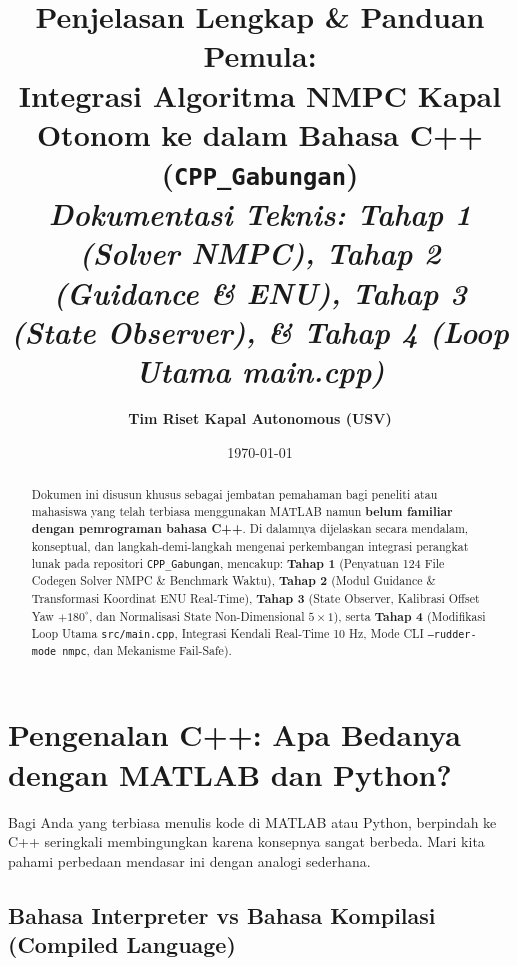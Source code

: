 \documentclass[11pt,a4paper]{article}
\title{
    \vspace{-1.0cm}
    \Huge \textbf{Penjelasan Lengkap \& Panduan Pemula:}\\[0.3cm]
    \LARGE Integrasi Algoritma NMPC Kapal Otonom ke dalam Bahasa C++ (\texttt{CPP\_Gabungan})\\[0.2cm]
    \large \textit{Dokumentasi Teknis: Tahap 1 (Solver NMPC), Tahap 2 (Guidance \& ENU), Tahap 3 (State Observer), \& Tahap 4 (Loop Utama main.cpp)}
}
\author{\textbf{Tim Riset Kapal Autonomous (USV)}}
\date{\today}
\begin{document}
\maketitle

\begin{abstract}
Dokumen ini disusun khusus sebagai jembatan pemahaman bagi peneliti atau mahasiswa yang telah terbiasa menggunakan MATLAB namun \textbf{belum familiar dengan pemrograman bahasa C++}. Di dalamnya dijelaskan secara mendalam, konseptual, dan langkah-demi-langkah mengenai perkembangan integrasi perangkat lunak pada repositori \texttt{CPP\_Gabungan}, mencakup: \textbf{Tahap 1} (Penyatuan 124 File Codegen Solver NMPC \& Benchmark Waktu), \textbf{Tahap 2} (Modul Guidance \& Transformasi Koordinat ENU Real-Time), \textbf{Tahap 3} (State Observer, Kalibrasi Offset Yaw $+180^\circ$, dan Normalisasi State Non-Dimensional $5 \times 1$), serta \textbf{Tahap 4} (Modifikasi Loop Utama \texttt{src/main.cpp}, Integrasi Kendali Real-Time 10 Hz, Mode CLI \texttt{--rudder-mode nmpc}, dan Mekanisme Fail-Safe).
\end{abstract}

\tableofcontents
\newpage

\section{Pengenalan C++: Apa Bedanya dengan MATLAB dan Python?}

Bagi Anda yang terbiasa menulis kode di MATLAB atau Python, berpindah ke C++ seringkali membingungkan karena konsepnya sangat berbeda. Mari kita pahami perbedaan mendasar ini dengan analogi sederhana.

\subsection{Bahasa Interpreter vs Bahasa Kompilasi (Compiled Language)}
\end{document}
